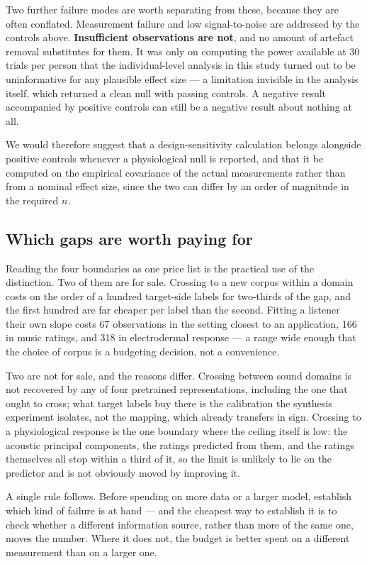Two further failure modes are worth separating from these, because they are often
conflated. Measurement failure and low signal-to-noise are addressed by the
controls above. \textbf{Insufficient observations are not}, and no amount of
artefact removal substitutes for them. It was only on computing the power available
at 30 trials per person that the individual-level analysis in this study turned out
to be uninformative for any plausible effect size --- a limitation invisible in the
analysis itself, which returned a clean null with passing controls. A negative
result accompanied by positive controls can still be a negative result about
nothing at all.

We would therefore suggest that a design-sensitivity calculation belongs alongside
positive controls whenever a physiological null is reported, and that it be
computed on the empirical covariance of the actual measurements rather than from a
nominal effect size, since the two can differ by an order of magnitude in the
required $n$.

\subsection*{Which gaps are worth paying for}

Reading the four boundaries as one price list is the practical use of the
distinction. Two of them are for sale. Crossing to a new corpus within a domain
costs on the order of a hundred target-side labels for two-thirds of the gap, and
the first hundred are far cheaper per label than the second. Fitting a listener
their own slope costs 67 observations in the setting closest to an application, 166
in music ratings, and 318 in electrodermal response --- a range wide enough that
the choice of corpus is a budgeting decision, not a convenience.

Two are not for sale, and the reasons differ. Crossing between sound domains is not
recovered by any of four pretrained representations, including the one that ought
to cross; what target labels buy there is the calibration the synthesis experiment
isolates, not the mapping, which already transfers in sign. Crossing to a
physiological response is the one boundary where the ceiling itself is low: the
acoustic principal components, the ratings predicted from them, and the ratings
themselves all stop within a third of it, so the limit is unlikely to lie on the
predictor and is not obviously moved by improving it.

A single rule follows. Before spending on more data or a larger model, establish
which kind of failure is at hand --- and the cheapest way to establish it is to
check whether a different information source, rather than more of the same one,
moves the number. Where it does not, the budget is better spent on a different
measurement than on a larger one.

